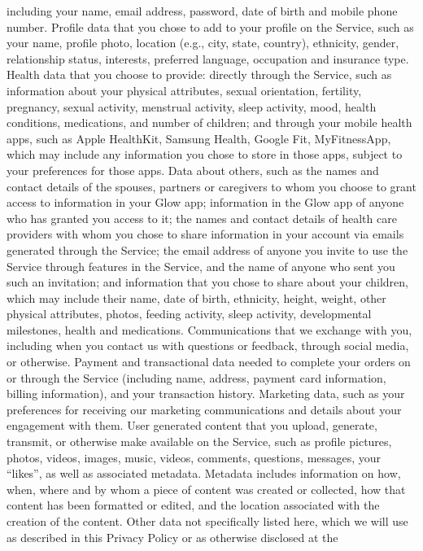 including your name, email address, password, date of birth and
mobile phone number.
Profile data that you chose to add to your profile on the Service,
such as your name, profile photo, location (e.g., city, state,
country), ethnicity, gender, relationship status, interests, preferred
language, occupation and insurance type.
Health data that you choose to provide:
directly through the Service, such as information about your
physical attributes, sexual orientation, fertility, pregnancy,
sexual activity, menstrual activity, sleep activity, mood, health
conditions, medications, and number of children; and
through your mobile health apps, such as Apple HealthKit,
Samsung Health, Google Fit, MyFitnessApp, which may include
any information you chose to store in those apps, subject to
your preferences for those apps.
Data about others, such as
the names and contact details of the spouses, partners or
caregivers to whom you choose to grant access to information
in your Glow app;
information in the Glow app of anyone who has granted you
access to it;
the names and contact details of health care providers with
whom you chose to share information in your account via
emails generated through the Service;
the email address of anyone you invite to use the Service
through features in the Service, and the name of anyone who
sent you such an invitation; and
information that you chose to share about your children, which
may include their name, date of birth, ethnicity, height, weight,
other physical attributes, photos, feeding activity, sleep
activity, developmental milestones, health and medications.
Communications that we exchange with you, including when you
contact us with questions or feedback, through social media, or
otherwise.
Payment and transactional data needed to complete your orders
on or through the Service (including name, address, payment card
information, billing information), and your transaction history.
Marketing data, such as your preferences for receiving our
marketing communications and details about your engagement with
them.
User generated content that you upload, generate, transmit, or
otherwise make available on the Service, such as profile pictures,
photos, videos, images, music, videos, comments, questions,
messages, your “likes”, as well as associated metadata. Metadata
includes information on how, when, where and by whom a piece of
content was created or collected, how that content has been
formatted or edited, and the location associated with the creation of
the content.
Other data not specifically listed here, which we will use as
described in this Privacy Policy or as otherwise disclosed at the
